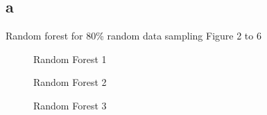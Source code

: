 \documentclass{article}
\begin{document}
\subsection{a}
Random forest for 80\% random data sampling Figure 2 to 6
\begin{center}
\begin{figure}
    \caption{Random Forest 1}
\end{figure}
\begin{figure}
    \caption{Random Forest 2}
\end{figure}
\begin{figure}
    \caption{Random Forest 3}
\end{figure}
\begin{figure}

\end{figure}
\end{center}
\end{document}
